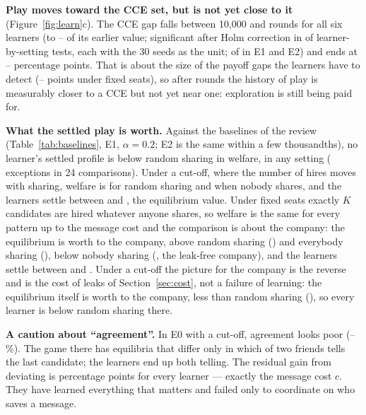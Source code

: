 \documentclass[10pt]{article}
\theoremstyle{plain}
\theoremstyle{definition}\newtheorem{definition}{Definition}
\newcommand{\finding}[1]{\textbf{#1}}
\begin{document}
\finding{Play moves toward the CCE set, but is not yet close to it} (Figure~\ref{fig:learn}c). The CCE gap falls between 10{,}000 and \XthreeT{} rounds for all six learners (to \GapRatioMin--\GapRatioMax{} of its earlier value;
significant after Holm correction in \GapFallSetSig{} of \GapFallSetTests{} learner-by-setting tests, each with the 30 seeds as the unit; \GapFallSetSigEonetwo{} of \GapFallSetTestsEonetwo{} in E1 and E2) and ends at \GapFinalMin--\GapFinalMax{} percentage points. That is about the size of the payoff gaps the learners have to
detect (\PayGapMinEoneSeats--\PayGapMaxEoneSeats{} points under fixed seats), so after \XthreeT{} rounds the history of play is measurably closer to a CCE but not yet near one:
exploration is still being paid for.

\finding{What the settled play is worth.} Against the baselines of the review (Table~\ref{tab:baselines}, E1, $\alpha=0.2$; E2 is the same within a few thousandths), no learner's settled profile is below random sharing in welfare, in any setting (\BaseLearnBelowWelfare{} exceptions in 24 comparisons).
Under a cut-off, where the number of hires moves with sharing, welfare is \BaseWRandomBar{} for random sharing and \BaseWNobodyBar{} when nobody shares, and the learners settle between \BaseWLearnMinBar{} and \BaseWEqBar{}, the equilibrium value.
Under fixed seats exactly $K$ candidates are hired whatever anyone shares, so welfare is the same for every pattern up to the message cost and the comparison is about the company: the equilibrium is worth \BaseVEqSeats{} to the company,
above random sharing (\BaseVRandomSeats) and everybody sharing (\BaseVEverySeats), below nobody sharing (\BaseVNobodySeats{}, the leak-free company), and the learners settle between \BaseVLearnMinSeats{} and \BaseVEqSeats.
Under a cut-off the picture for the company is the reverse and is the cost of leaks of Section~\ref{sec:cost}, not a failure of learning: the equilibrium itself is worth \BaseVEqBar{} to the company, less than random sharing (\BaseVRandomBar), so every learner is below random sharing there.

\finding{A caution about ``agreement''.} In E0 with a cut-off, agreement looks poor (\AgreeEzeroBarMin--\AgreeEzeroBarMax\%). The game there has \NumEqEzeroBar{} equilibria that differ only in which of two friends tells the last candidate; the learners end up
both telling. The residual gain from deviating is \ExplEzeroBarMin{} percentage points for every learner --- exactly the message cost $c$. They have learned everything that matters and failed only to coordinate on who saves a message.
\end{document}
